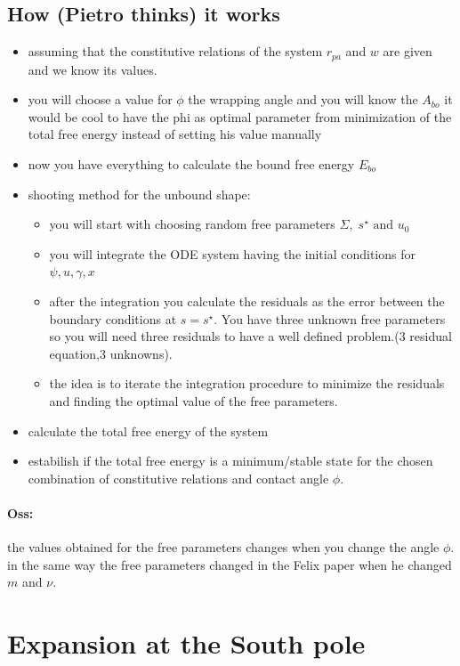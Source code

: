 \documentclass[12pt]{article}
\begin{document}
\subsection{How (Pietro thinks) it works}
\begin{itemize}
  \item assuming that the constitutive relations of the system $r_{pa}$ and $w$ are given and we know its values.
  \item you will choose a value for $\phi$ the wrapping angle and you will know the $A_{bo}$ \alert{it would be cool to have the phi as optimal parameter from minimization of the total free energy instead of setting his value manually}
  \item now you have everything to calculate the bound free energy $E_{bo}$
  \item shooting method for the unbound shape: 
    \begin{itemize}
      \item you will start with choosing random free parameters $\Sigma,\; s^\star \text{ and }u_0$
      \item you will integrate the ODE system having the initial conditions for $\psi,u,\gamma,x$
      \item after the integration you calculate the residuals as the error between the boundary conditions at $s=s^\star$. You have three unknown free parameters so you will need three residuals to have a well defined problem.(3 residual equation,3 unknowns).
      \item the idea is to iterate the integration procedure to minimize the residuals and finding the optimal value of the free parameters.
    \end{itemize}
  \item calculate the total free energy of the system
  \item estabilish if the total free energy is a minimum/stable state for the chosen combination of constitutive relations and contact angle $\phi$.
\end{itemize}


\paragraph{Oss:} the values obtained for the free parameters changes when you change the angle $\phi$. in the same way the free parameters changed in the Felix paper when he changed $m$ and $\nu$.


\section{Expansion at the South pole}
\end{document}

